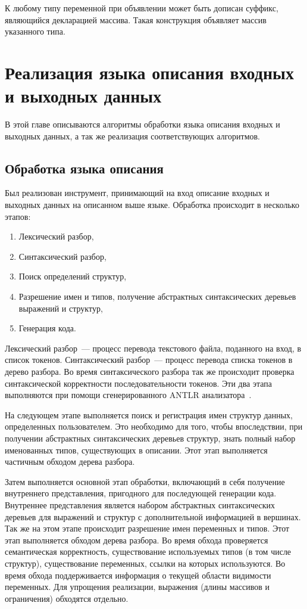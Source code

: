\documentclass[times,specification,annotation]{style/itmo-student-thesis/itmo-student-thesis}
\begin{document}
К любому типу переменной при объявлении может быть дописан суффикс, являющийся декларацией массива. Такая конструкция объявляет массив указанного типа.

\chapter{Реализация языка описания входных и выходных данных}

В этой главе описываются алгоритмы обработки языка описания входных и выходных данных, а так же реализация соответствующих алгоритмов.

\section{Обработка языка описания}

Был реализован инструмент, принимающий на вход описание входных и выходных данных на описанном выше языке. Обработка происходит в несколько этапов:

\begin{enumerate}
    \item Лексический разбор,
    \item Синтаксический разбор,
    \item Поиск определений структур,
    \item Разрешение имен и типов, получение абстрактных синтаксических деревьев выражений и структур,
    \item Генерация кода.
\end{enumerate}

Лексический разбор~--- процесс перевода текстового файла, поданного на вход, в список токенов. Синтаксический разбор~--- процесс перевода списка токенов в дерево разбора. Во время синтаксического разбора так же происходит проверка синтаксической корректности последовательности токенов. Эти два этапа выполняются при помощи сгенерированного ANTLR анализатора~\cite{parr2013definitive}.

На следующем этапе выполняется поиск и регистрация имен структур данных, определенных пользователем. Это необходимо для того, чтобы впоследствии, при получении абстрактных синтаксических деревьев структур, знать полный набор именованных типов, существующих в описании. Этот этап выполняется частичным обходом дерева разбора.

Затем выполняется основной этап обработки, включающий в себя получение внутреннего представления, пригодного для последующей генерации кода. Внутреннее представления является набором абстрактных синтаксических деревьев для выражений и структур с дополнительной информацией в вершинах. Так же на этом этапе происходит разрешение имен переменных и типов. Этот этап выполняется обходом дерева разбора. Во время обхода проверяется семантическая корректность, существование используемых типов (в том числе структур), существование переменных, ссылки на которых используются. Во время обхода поддерживается информация о текущей области видимости переменных. Для упрощения реализации, выражения (длины массивов и ограничения) обходятся отдельно.
\end{document}
